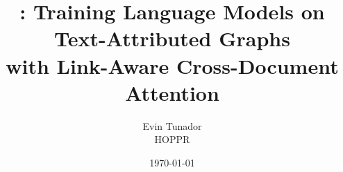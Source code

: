 \documentclass[11pt]{article}
\title{\method: Training Language Models on Text-Attributed Graphs\\
       with Link-Aware Cross-Document Attention}
\author{Evin Tunador\\HOPPR}
\date{\today}
\begin{document}
\maketitle

\begin{abstract}

\end{abstract}













\appendix

\end{document}
